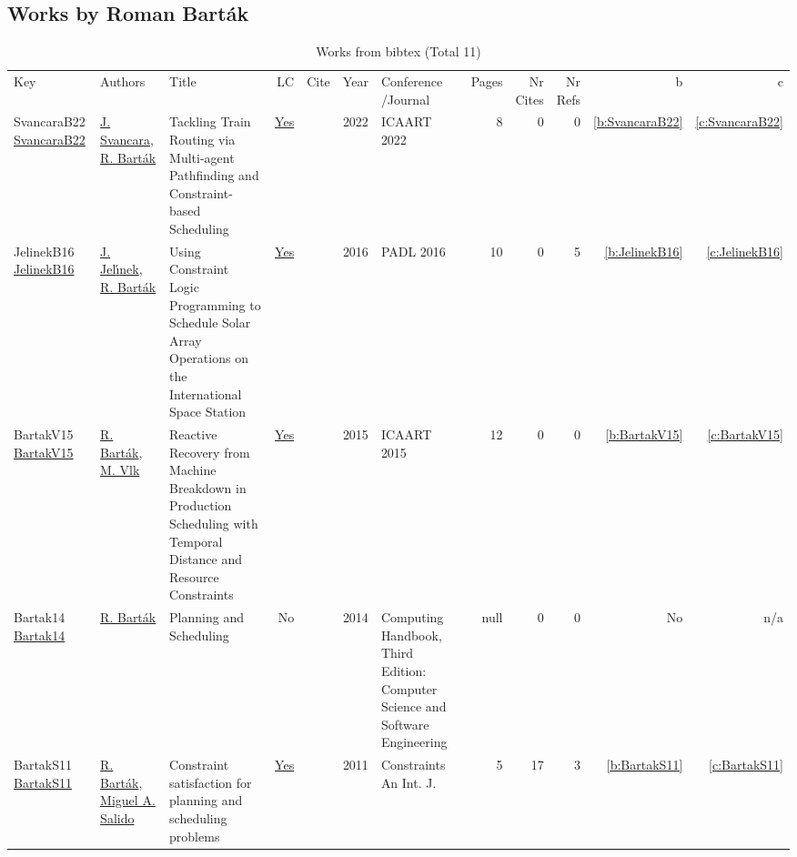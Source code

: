 \subsection{Works by Roman Bart{\'{a}}k}
\label{sec:a153}
{\scriptsize
\begin{longtable}{>{\raggedright\arraybackslash}p{3cm}>{\raggedright\arraybackslash}p{6cm}>{\raggedright\arraybackslash}p{6.5cm}rrrp{2.5cm}rrrrr}
\rowcolor{white}\caption{Works from bibtex (Total 11)}\\ \toprule
\rowcolor{white}Key & Authors & Title & LC & Cite & Year & \shortstack{Conference\\/Journal} & Pages & \shortstack{Nr\\Cites} & \shortstack{Nr\\Refs} & b & c \\ \midrule\endhead
\bottomrule
\endfoot
SvancaraB22 \href{https://doi.org/10.5220/0010869700003116}{SvancaraB22} & \hyperref[auth:a788]{J. Svancara}, \hyperref[auth:a153]{R. Bart{\'{a}}k} & Tackling Train Routing via Multi-agent Pathfinding and Constraint-based Scheduling & \href{works/SvancaraB22.pdf}{Yes} & \cite{SvancaraB22} & 2022 & ICAART 2022 & 8 & 0 & 0 & \ref{b:SvancaraB22} & \ref{c:SvancaraB22}\\
JelinekB16 \href{https://doi.org/10.1007/978-3-319-28228-2\_1}{JelinekB16} & \hyperref[auth:a789]{J. Jel{\'{\i}}nek}, \hyperref[auth:a153]{R. Bart{\'{a}}k} & Using Constraint Logic Programming to Schedule Solar Array Operations on the International Space Station & \href{works/JelinekB16.pdf}{Yes} & \cite{JelinekB16} & 2016 & PADL 2016 & 10 & 0 & 5 & \ref{b:JelinekB16} & \ref{c:JelinekB16}\\
BartakV15 \href{}{BartakV15} & \hyperref[auth:a153]{R. Bart{\'{a}}k}, \hyperref[auth:a314]{M. Vlk} & Reactive Recovery from Machine Breakdown in Production Scheduling with Temporal Distance and Resource Constraints & \href{works/BartakV15.pdf}{Yes} & \cite{BartakV15} & 2015 & ICAART 2015 & 12 & 0 & 0 & \ref{b:BartakV15} & \ref{c:BartakV15}\\
Bartak14 \href{}{Bartak14} & \hyperref[auth:a153]{R. Bart{\'{a}}k} & Planning and Scheduling & No & \cite{Bartak14} & 2014 & Computing Handbook, Third Edition: Computer Science and Software Engineering & null & 0 & 0 & No & n/a\\
BartakS11 \href{https://doi.org/10.1007/s10601-011-9109-4}{BartakS11} & \hyperref[auth:a153]{R. Bart{\'{a}}k}, \hyperref[auth:a154]{Miguel A. Salido} & Constraint satisfaction for planning and scheduling problems & \href{works/BartakS11.pdf}{Yes} & \cite{BartakS11} & 2011 & Constraints An Int. J. & 5 & 17 & 3 & \ref{b:BartakS11} & \ref{c:BartakS11}\\

\end{longtable}}
